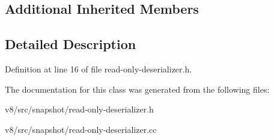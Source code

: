 \subsection*{Additional Inherited Members}


\subsection{Detailed Description}


Definition at line 16 of file read-\/only-\/deserializer.\+h.



The documentation for this class was generated from the following files\+:\begin{DoxyCompactItemize}
\item 
v8/src/snapshot/read-\/only-\/deserializer.\+h\item 
v8/src/snapshot/read-\/only-\/deserializer.\+cc\end{DoxyCompactItemize}

